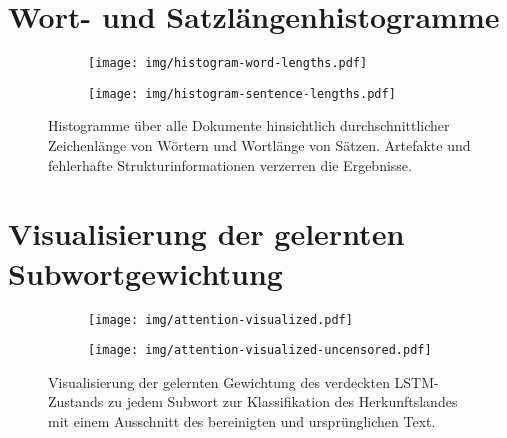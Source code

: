\documentclass[bachelor,german]{info1thesis}
\begin{document}
\thesisbibliography


\appendix

\chapter{Wort- und Satzlängenhistogramme}
\label{app:word-sentence-lengths}

\begin{figure}[h!]
     \centering
     \begin{subfigure}[b]{0.49\textwidth}
         \centering
         \texttt{[image: img/histogram-word-lengths.pdf]}
         \label{fig:hist-mentions}
     \end{subfigure}
     \hfill
     \begin{subfigure}[b]{0.49\textwidth}
         \centering
         \texttt{[image: img/histogram-sentence-lengths.pdf]}
         \label{fig:hist-clusters}
     \end{subfigure}
     \caption{Histogramme über alle Dokumente hinsichtlich durchschnittlicher Zeichenlänge von Wörtern und Wortlänge von Sätzen. Artefakte und fehlerhafte Strukturinformationen verzerren die Ergebnisse.}
     \label{fig:droc-histograms}
\end{figure}

\chapter{Visualisierung der gelernten Subwortgewichtung}
\label{app:visualized-texts}

\begin{figure}[h!]
     \centering
     \begin{subfigure}[b]{\textwidth}
         \centering
         \texttt{[image: img/attention-visualized.pdf]}
         \label{fig:visualized-cleaned-text}
     \end{subfigure}
     \begin{subfigure}[b]{\textwidth}
         \centering
         \vspace{.5em}
         \texttt{[image: img/attention-visualized-uncensored.pdf]}
         \label{fig:visualized-original-text}
     \end{subfigure}
     \caption{Visualisierung der gelernten Gewichtung des verdeckten LSTM-Zustands zu jedem Subwort zur Klassifikation des Herkunftslandes mit einem Ausschnitt des bereinigten und ursprünglichen Text.}
\end{figure}
\end{document}
